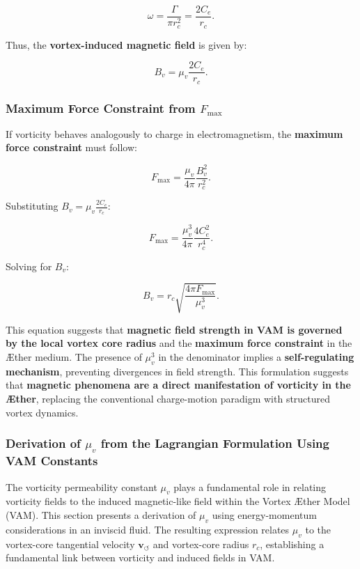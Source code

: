 \documentclass[a4paper,10pt]{article}
\begin{document}
    \begin{equation*}
        \omega = \frac{\Gamma}{\pi r_c^2} = \frac{2 C_e}{r_c}.
    \end{equation*}

    Thus, the \textbf{vortex-induced magnetic field} is given by:

    \begin{equation*}
        B_v = \mu_v \frac{2 C_e}{r_c}.
    \end{equation*}

    \subsubsection*{Maximum Force Constraint from \( F_{\max} \)}
    If vorticity behaves analogously to charge in electromagnetism, the \textbf{maximum force constraint} must follow:

    \begin{equation*}
        F_{\max} = \frac{\mu_v}{4\pi} \frac{B_v^2}{r_c^2}.
    \end{equation*}

    Substituting \( B_v = \mu_v \frac{2 C_e}{r_c} \):

    \begin{equation*}
        F_{\max} = \frac{\mu_v^3}{4\pi} \frac{4 C_e^2}{r_c^4}.
    \end{equation*}

    Solving for \( B_v \):

    \begin{equation*}
        B_v = r_c \sqrt{\frac{4\pi F_{\max}}{\mu_v^3}}.
    \end{equation*}

    This equation suggests that \textbf{magnetic field strength in VAM is governed by the local vortex core radius} and the \textbf{maximum force constraint} in the Æther medium. The presence of \( \mu_v^3 \) in the denominator implies a \textbf{self-regulating mechanism}, preventing divergences in field strength.  This formulation suggests that \textbf{magnetic phenomena are a direct manifestation of vorticity in the Æther}, replacing the conventional charge-motion paradigm with structured vortex dynamics.

\subsubsection*{Derivation of \( \mu_v \) from the Lagrangian Formulation Using VAM Constants}
The vorticity permeability constant \( \mu_v \) plays a fundamental role in relating vorticity fields to the induced magnetic-like field within the Vortex Æther Model (VAM). This section presents a derivation of \( \mu_v \) using energy-momentum considerations in an inviscid fluid. The resulting expression relates \( \mu_v \) to the vortex-core tangential velocity \( \mathbf{v}_{\scriptscriptstyle\boldsymbol{\circlearrowleft}} \) and vortex-core radius \( r_c \), establishing a fundamental link between vorticity and induced fields in VAM.
\end{document}
